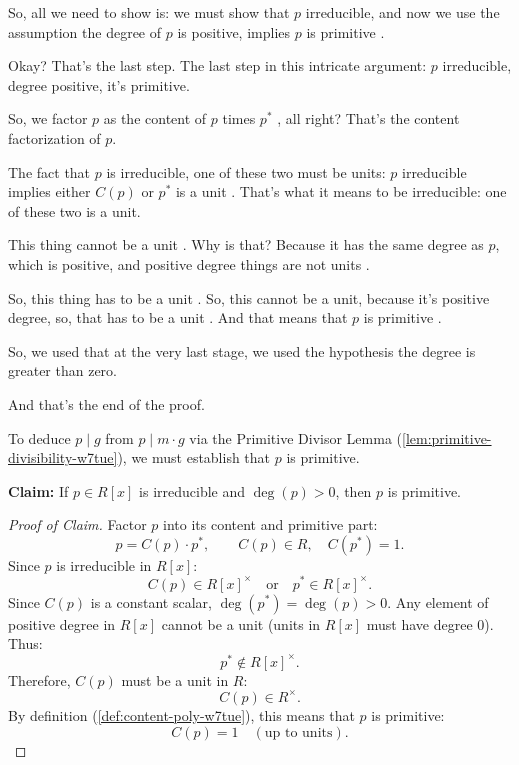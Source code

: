\begin{proofWrapper}
\begin{speech}[00:37:08 - 00:39:19]
So, all we need to show is: we must show that $p$ irreducible, and now we use the assumption the degree of $p$ is positive, implies $p$ is primitive .

Okay? That's the last step. The last step in this intricate argument: $p$ irreducible, degree positive, it's primitive.

So, we factor $p$ as the content of $p$ times $p^*$ , all right? That's the content factorization of $p$.

The fact that $p$ is irreducible, one of these two must be units: $p$ irreducible implies either $C(p)$ or $p^*$ is a unit . That's what it means to be irreducible: one of these two is a unit.

This thing cannot be a unit . Why is that? Because it has the same degree as $p$, which is positive, and positive degree things are not units .

So, this thing has to be a unit . So, this cannot be a unit, because it's positive degree, so, that has to be a unit . And that means that $p$ is primitive .

So, we used that at the very last stage, we used the hypothesis the degree is greater than zero.

And that's the end of the proof.
\end{speech}

\begin{content}
To deduce $p \mid g$ from $p \mid m \cdot g$ via the Primitive Divisor Lemma (\cref{lem:primitive-divisibility-w7tue}), we must establish that $p$ is primitive.

\textbf{Claim:} If $p \in R[x]$ is irreducible and $\deg(p) > 0$, then $p$ is primitive.
\begin{proof}[Proof of Claim]
Factor $p$ into its content and primitive part:
\[
p = C(p) \cdot p^*, \qquad C(p) \in R, \quad C(p^*) = 1.
\]
Since $p$ is irreducible in $R[x]$:
\[
C(p) \in R[x]^\times \quad \text{or} \quad p^* \in R[x]^\times.
\]
Since $C(p)$ is a constant scalar, $\deg(p^*) = \deg(p) > 0$. Any element of positive degree in $R[x]$ cannot be a unit (units in $R[x]$ must have degree $0$). Thus:
\[
p^* \notin R[x]^\times.
\]
Therefore, $C(p)$ must be a unit in $R$:
\[
C(p) \in R^\times.
\]
By definition (\cref{def:content-poly-w7tue}), this means that $p$ is primitive:
\[
C(p) = 1 \quad (\text{up to units}).
\]
\end{proof}


\end{content}
\end{proofWrapper}
